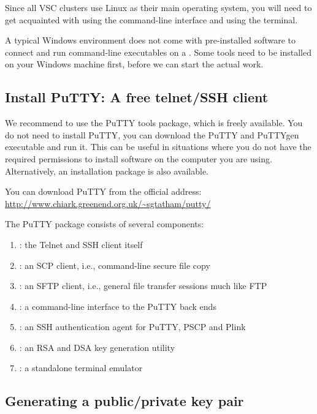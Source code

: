 Since all VSC clusters use Linux as their main operating system, you will
need to get acquainted with using the command-line interface and using the
terminal.

\ifwindows
  A typical Windows environment does not come with pre-installed
  software to connect and run command-line executables on a \hpc. Some tools
  need to be installed on your Windows machine first, before we can start the
  actual work.

  \subsection{Install PuTTY: A free telnet/SSH client}
  \label{sec:install-putty}

  We recommend to use the PuTTY tools package, which is freely available. You
  do not need to install PuTTY, you can download the PuTTY and PuTTYgen executable
  and run it. This can be useful in situations where you do not have the
  required permissions to install software on the computer you are using.
  Alternatively, an installation package is also available.

  You can download PuTTY from the official address:
  \url{http://www.chiark.greenend.org.uk/\~sgtatham/putty/}

  The PuTTY package consists of several components:

  \begin{enumerate}
    \item  {}: the Telnet and SSH client itself
    \item  {}: an SCP client, i.e., command-line secure file copy
    \item  {}: an SFTP client, i.e., general file transfer sessions much like FTP
    \item  {}: a command-line interface to the PuTTY back ends
    \item  {}: an SSH authentication agent for PuTTY, PSCP and Plink
    \item  {}: an RSA and DSA key generation utility
    \item  {}: a standalone terminal emulator
  \end{enumerate}

  \subsection{Generating a public/private key pair}
  \label{sec:generate-key-pair}

